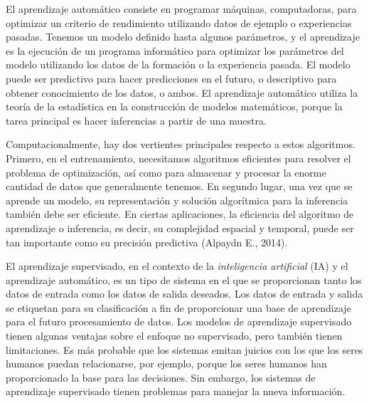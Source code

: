 El aprendizaje automático consiste en programar máquinas, computadoras, para optimizar un criterio de rendimiento utilizando datos de ejemplo o experiencias pasadas. Tenemos un modelo definido hasta algunos parámetros, y el aprendizaje es la ejecución de un programa informático para optimizar los parámetros del modelo utilizando los datos de la formación o la experiencia pasada. El modelo puede ser predictivo para hacer predicciones en el futuro, o descriptivo para obtener conocimiento de los datos, o ambos. El aprendizaje automático utiliza la teoría de la estadística en la construcción de modelos matemáticos, porque la tarea principal es hacer inferencias a partir de una muestra.  

Computacionalmente, hay dos vertientes principales respecto a estos algoritmos. Primero, en el entrenamiento, necesitamos algoritmos eficientes para resolver el problema de optimización, así como para almacenar y procesar la enorme cantidad de datos que generalmente tenemos. En segundo lugar, una vez que se aprende un modelo, su representación y solución algorítmica para la inferencia también debe ser eficiente. En ciertas aplicaciones, la eficiencia del algoritmo de aprendizaje o inferencia, es decir, su complejidad espacial y temporal, puede ser tan importante como su precisión predictiva (Alpaydn E., 2014).

El aprendizaje supervisado, en el contexto de la \textit{inteligencia artificial} (IA) y el aprendizaje automático, es un tipo de sistema en el que se proporcionan tanto los datos de entrada como los datos de salida deseados. Los datos de entrada y salida se etiquetan para su clasificación a fin de proporcionar una base de aprendizaje para el futuro procesamiento de datos. Los modelos de aprendizaje supervisado tienen algunas ventajas sobre el enfoque no supervisado, pero también tienen limitaciones. Es más probable que los sistemas emitan juicios con los que los seres humanos puedan relacionarse, por ejemplo, porque los seres humanos han proporcionado la base para las decisiones. Sin embargo, los sistemas de aprendizaje supervisado tienen problemas para manejar la nueva información. 

